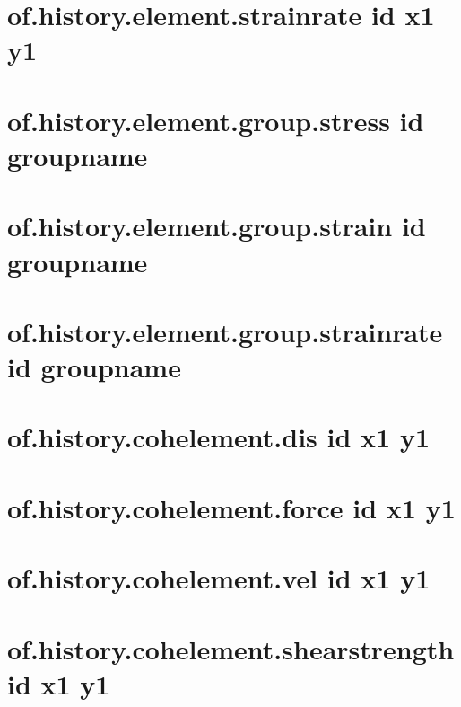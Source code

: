\documentclass[letterpaper,10pt,english]{sphinxmanual}
\begin{document}
\section{of.history.element.strainrate id x1 y1}
\label{\detokenize{rst_tutorials/command_line_guide:of-history-element-strainrate-id-x1-y1}}

\section{of.history.element.group.stress id groupname}
\label{\detokenize{rst_tutorials/command_line_guide:of-history-element-group-stress-id-groupname}}\label{\detokenize{rst_tutorials/command_line_guide:section-18}}

\section{of.history.element.group.strain id groupname}
\label{\detokenize{rst_tutorials/command_line_guide:of-history-element-group-strain-id-groupname}}

\section{of.history.element.group.strainrate id groupname}
\label{\detokenize{rst_tutorials/command_line_guide:of-history-element-group-strainrate-id-groupname}}

\section{of.history.cohelement.dis id x1 y1}
\label{\detokenize{rst_tutorials/command_line_guide:of-history-cohelement-dis-id-x1-y1}}\label{\detokenize{rst_tutorials/command_line_guide:section-19}}

\section{of.history.cohelement.force id x1 y1}
\label{\detokenize{rst_tutorials/command_line_guide:of-history-cohelement-force-id-x1-y1}}

\section{of.history.cohelement.vel id x1 y1}
\label{\detokenize{rst_tutorials/command_line_guide:of-history-cohelement-vel-id-x1-y1}}

\section{of.history.cohelement.shearstrength id x1 y1}
\label{\detokenize{rst_tutorials/command_line_guide:of-history-cohelement-shearstrength-id-x1-y1}}
\end{document}

